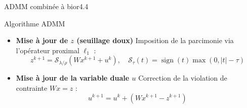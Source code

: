 \begin{frame}{ADMM combinée à bior4.4}
{\begin{block}{Algorithme ADMM}
\begin{itemize}
            \item \textbf{Mise à jour de $z$ (seuillage doux)}  
            Imposition de la parcimonie via l’opérateur proximal $\ell_1$ :
            \[
            z^{k+1} = \mathcal{S}_{\lambda / \rho}(Wx^{k+1} + u^k), \quad
            \mathcal{S}_{\tau}(t) = \operatorname{sign}(t)\max(0, |t|-\tau)
            \]

            \item \textbf{Mise à jour de la variable duale $u$}  
            Correction de la violation de contrainte $Wx = z$ :
            \[
            u^{k+1} = u^k + (Wx^{k+1} - z^{k+1})
            \]
        \end{itemize}
    \end{block}}
\end{frame}
